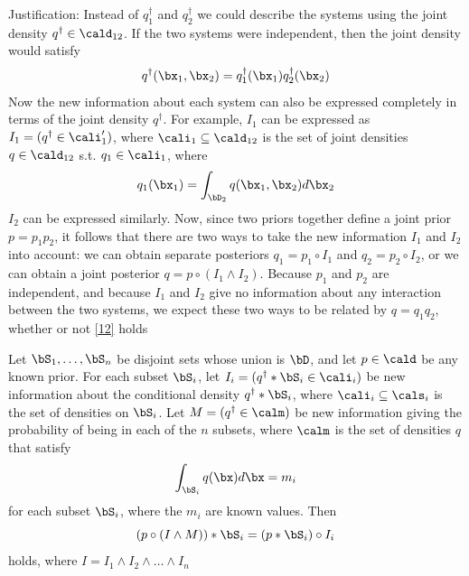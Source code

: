 \documentclass[11pt]{article}
\begin{document}
Justification: Instead of \(q_1^\dag\) and \(q_2^\dag\) we could describe the systems using the joint
density \(q^\dag\in\cald_{12}\). If the two systems were independent, then the joint density would
satisfy
\begin{equation}
\label{12}
q^\dag(\bx_1,\bx_2)=q_1^\dag(\bx_1)q_2^\dag(\bx_2)
\end{equation}
Now the new information about each system can also be expressed completely in terms of the joint
density \(q^\dag\). For example, \(I_1\) can be expressed as \(I_1=(q^\dag\in\cali_1')\), where
\(\cali_1\subseteq\cald_{12}\) is the set of joint densities \(q\in\cald_{12}\) s.t.
\(q_1\in\cali_1\), where
\begin{equation*}
q_1(\bx_1)=\int_{\bD_2}q(\bx_1,\bx_2)d\bx_2
\end{equation*}
\(I_2\) can be expressed similarly. Now, since two priors together define a joint prior \(p=p_1p_2\),
it follows that there are two ways to take the new information \(I_1\) and \(I_2\) into account: we
can obtain separate posteriors \(q_1=p_1\circ I_1\) and \(q_2=p_2\circ I_2\), or we can obtain a joint
posterior \(q=p\circ(I_1\wedge I_2)\). Because \(p_1\) and \(p_2\) are independent, and because
\(I_1\) and \(I_2\) give no information about any interaction between the two systems, we expect these
two ways to be related by \(q=q_1q_2\), whether or not \eqref{12} holds

\begin{axiom}
Let \(\bS_1,\dots,\bS_n\) be disjoint sets whose union is \(\bD\), and let \(p\in\cald\) be any known
prior. For each subset \(\bS_i\), let \(I_i=(q^\dag*\bS_i\in\cali_i)\) be new information about the
conditional density \(q^\dag*\bS_i\), where \(\cali_i\subseteq\cals_i\) is the set of densities on
\(\bS_i\). Let \(M=(q^\dag\in\calm)\) be new information giving the probability of being in each of
the \(n\) subsets, where \(\calm\) is the set of densities \(q\) that satisfy
\begin{equation}
\label{13}
\int_{\bS_i}q(\bx)d\bx=m_i
\end{equation}
for each subset \(\bS_i\), where the \(m_i\) are known values. Then
\begin{equation*}
(p\circ(I\wedge M))*\bS_i=(p*\bS_i)\circ I_i
\end{equation*}
holds, where \(I=I_1\wedge I_2\wedge\dots\wedge I_n\)
\end{axiom}
\end{document}
